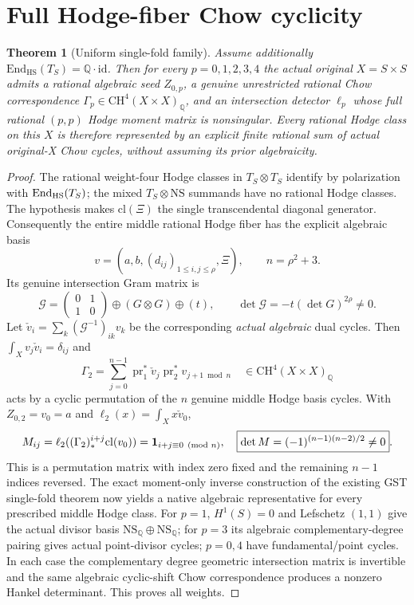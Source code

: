 \documentclass[11pt]{article}
\newtheorem{theorem}{Theorem}
\newcommand{\Q}{\mathbb Q}
\newcommand{\CH}{\mathrm{CH}}
\newcommand{\cl}{\mathrm{cl}}
\newcommand{\End}{\mathrm{End}}
\begin{document}
\section{Full Hodge-fiber Chow cyclicity}
\begin{theorem}[Uniform single-fold family]
Assume additionally $\End_{\mathrm{HS}}(T_S)=\Q\cdot\mathrm{id}$. Then for every $p=0,1,2,3,4$ the actual original $X=S\times S$ admits a rational algebraic seed $Z_{0,p}$, a genuine unrestricted rational Chow correspondence $\Gamma_p\in\CH^4(X\times X)_\Q$, and an intersection detector $\ell_p$ whose full rational $(p,p)$ Hodge moment matrix is nonsingular. Every rational Hodge class on this $X$ is therefore represented by an explicit finite rational sum of actual original-X Chow cycles, without assuming its prior algebraicity.
\end{theorem}
\begin{proof}
The rational weight-four Hodge classes in $T_S\otimes T_S$ identify by polarization with $\End_{\rm HS}(T_S)$; the mixed $T_S\otimes\mathrm{NS}$ summands have no rational Hodge classes. The hypothesis makes $\cl(\Xi)$ the single transcendental diagonal generator. Consequently the entire middle rational Hodge fiber has the explicit algebraic basis
\[
 v=(a,b,(d_{ij})_{1\le i,j\le\rho},\Xi),
 \qquad n=\rho^2+3.
\]
Its genuine intersection Gram matrix is
\[
 \mathcal G=\begin{pmatrix}0&1\\1&0\end{pmatrix}
 \oplus(G\otimes G)\oplus(t),
 \qquad \boxed{\det\mathcal G=-t(\det G)^{2\rho}\ne0}.
\]
Let $\check v_i=\sum_k(\mathcal G^{-1})_{ik}v_k$ be the corresponding \emph{actual algebraic} dual cycles. Then $\int_X v_j\check v_i=\delta_{ij}$ and
\[
 \Gamma_2=\sum_{j=0}^{n-1}
 \operatorname{pr}_1^*\check v_j\operatorname{pr}_2^*v_{j+1\bmod n}
 \quad\in\CH^4(X\times X)_\Q
\]
acts by a cyclic permutation of the $n$ genuine middle Hodge basis cycles.
With $Z_{0,2}=v_0=a$ and $\ell_2(x)=\int_Xx\check v_0$,
\[
 M_{ij}=\ell_2((\Gamma_2)_*^{i+j}\cl(v_0))
 ={\bf1}_{i+j\equiv0\pmod n},\quad
 \boxed{\det M=(-1)^{(n-1)(n-2)/2}\ne0}.
\]
This is a permutation matrix with index zero fixed and the remaining $n-1$ indices reversed. The exact moment-only inverse construction of the existing GST single-fold theorem now yields a native algebraic representative for every prescribed middle Hodge class.
For $p=1$, $H^1(S)=0$ and Lefschetz $(1,1)$ give the actual divisor basis $\mathrm{NS}_\Q\oplus\mathrm{NS}_\Q$; for $p=3$ its algebraic complementary-degree pairing gives actual point-divisor cycles; $p=0,4$ have fundamental/point cycles. In each case the complementary degree geometric intersection matrix is invertible and the same algebraic cyclic-shift Chow correspondence produces a nonzero Hankel determinant. This proves all weights.
\end{proof}
\end{document}
